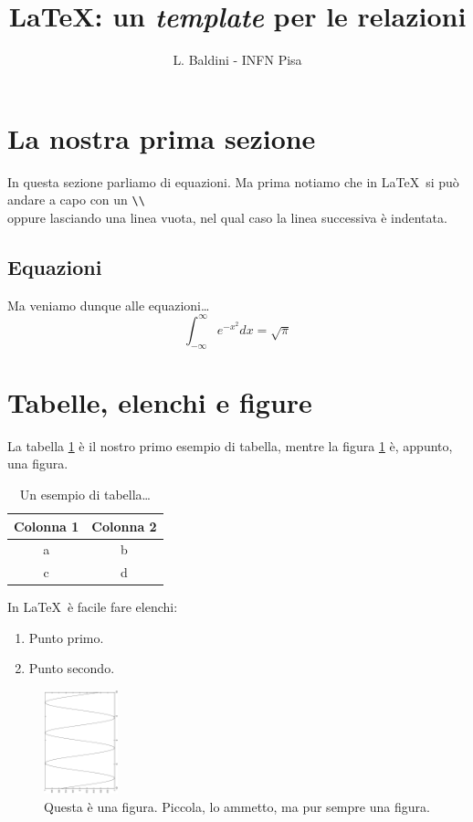\documentclass[a4paper, 10pt]{article}
\begin{document}
\title{\LaTeX: un \emph{template} per le relazioni}
\author{L. Baldini - INFN Pisa}
\maketitle

\section{La nostra prima sezione}
In questa sezione parliamo di equazioni. Ma prima notiamo che in \LaTeX\ si
pu\`o andare a capo con un \verb|\\|\\
oppure lasciando una linea vuota, nel qual caso la linea
successiva \`e indentata.

\subsection{Equazioni}
Ma veniamo dunque alle equazioni\ldots
\begin{equation}
\int_{-\infty}^{\infty} e^{-x^2} dx = \sqrt{\pi}
\end{equation}

\section{Tabelle, elenchi e figure}

La tabella \ref{UnaTabella} \`e il nostro primo esempio di tabella,
mentre la figura \ref{UnaFigura} \`e, appunto, una figura.

\begin{table}[htb!]
\begin{center}
\begin{tabular}{cc}
\hline
Colonna 1 & Colonna 2\\
\hline
\hline
a & b \\
c & d \\
\hline
\end{tabular}
\caption{Un esempio di tabella\ldots}
\label{UnaTabella}
\end{center}
\end{table}

\noindent In \LaTeX\ \`e facile fare elenchi:
\begin{enumerate}
\item{Punto primo.}
\item{Punto secondo.}
\end{enumerate}

\begin{figure}[htb!]
\begin{center}
\includegraphics[height=3cm, angle=270]{figura.eps}
\caption{Questa \`e una figura. Piccola, lo ammetto, ma pur sempre una figura.}
\label{UnaFigura}
\end{center}
\end{figure}
\end{document}
